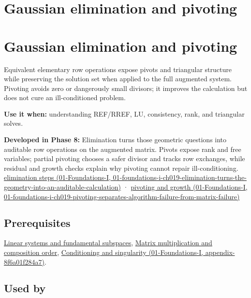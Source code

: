 \hypertarget{appendix-f6e77f4a200f}{}
\section*{Gaussian elimination and pivoting}
\section{Gaussian elimination and pivoting}\label{appendix-f6e77f4a200f-gaussian-elimination-and-pivoting}

Equivalent elementary row operations expose pivots and triangular structure while preserving the solution set when applied to the full augmented system. Pivoting avoids zero or dangerously small divisors; it improves the calculation but does not cure an ill-conditioned problem.

\textbf{Use it when:} understanding REF/RREF, LU, consistency, rank, and triangular solves.

\textbf{Developed in Phase 8:} Elimination turns those geometric questions into auditable row operations on the augmented matrix. Pivots expose rank and free variables; partial pivoting chooses a safer divisor and tracks row exchanges, while residual and growth checks explain why pivoting cannot repair ill-conditioning. \href{../01-Foundations-I/main.pdf\#nameddest=01-foundations-i-ch019-elimination-turns-the-geometry-into-an-auditable-calculation}{elimination steps (01-Foundations-I, 01-foundations-i-ch019-elimination-turns-the-geometry-into-an-auditable-calculation)} · \href{../01-Foundations-I/main.pdf\#nameddest=01-foundations-i-ch019-pivoting-separates-algorithm-failure-from-matrix-failure}{pivoting and growth (01-Foundations-I, 01-foundations-i-ch019-pivoting-separates-algorithm-failure-from-matrix-failure)}

\subsection{Prerequisites}\label{appendix-f6e77f4a200f-prerequisites}

\hyperref[appendix-8572a4a060c1]{Linear systems and fundamental subspaces}, \hyperref[appendix-ab31ef447dbf]{Matrix multiplication and composition order}, \href{../01-Foundations-I/main.pdf\#nameddest=appendix-8f6a01f284a7}{Conditioning and singularity (01-Foundations-I, appendix-8f6a01f284a7)}.

\subsection{Used by}\label{appendix-f6e77f4a200f-used-by}

